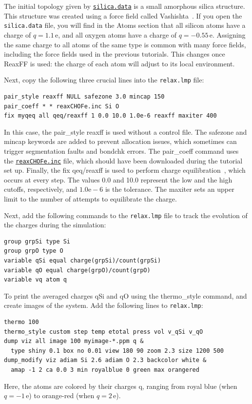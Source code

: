 \documentclass[9pt,tutorial]{livecoms}
\newcommand{\lmpcmd}[1]{\hspace{0pt}\colorbox{listing}{\textcolor{command}{\small{#1}}}\hspace{0pt}} %
\newcommand{\flecmd}[1]{\textcolor{command}{\texttt{#1}}} %
\newcommand{\dwlcmd}[1]{\textcolor{download}{\texttt{#1}}} %
\newcommand{\filepath}{https://raw.githubusercontent.com/lammpstutorials/lammpstutorials-article/main/files/}
\begin{document}
The initial topology given by \href{\filepath tutorial5/silica.data}{\dwlcmd{silica.data}}
is a small amorphous silica structure.  This structure was created using a force field called
Vashishta~\cite{vashishta1990interaction}.  If you open the \flecmd{silica.data}
file, you will find in the \lmpcmd{Atoms} section that all silicon atoms have a
charge of $q = 1.1\,\text{e}$, and all oxygen atoms have a charge of $q = -0.55\,\text{e}$.
Assigning the same charge to all atoms of the same type is common with many
force fields, including the force fields used in the previous tutorials.  This
changes once ReaxFF is used: the charge of each atom will adjust to its local
environment.

Next, copy the following three crucial lines into the \flecmd{relax.lmp} file:
\begin{lstlisting}
pair_style reaxff NULL safezone 3.0 mincap 150
pair_coeff * * reaxCHOFe.inc Si O
fix myqeq all qeq/reaxff 1 0.0 10.0 1.0e-6 reaxff maxiter 400
\end{lstlisting}
In this case, the \lmpcmd{pair\_style reaxff} is used without a control file.  The
\lmpcmd{safezone} and \lmpcmd{mincap} keywords are added to prevent
allocation issues, which sometimes can trigger segmentation faults and
\lmpcmd{bondchk} errors.  The \lmpcmd{pair\_coeff} command uses the
\href{\filepath tutorial5/reaxCHOFe.inc}{\dwlcmd{reaxCHOFe.inc}}
file, which should have been downloaded during the tutorial set up.  Finally, the
\lmpcmd{fix qeq/reaxff} is used to perform charge equilibration~\cite{rappe1991charge},
which occurs at every step.  The values 0.0 and 10.0 represent the
low and the high cutoffs, respectively, and $1.0 \text{e} -6$ is the tolerance.
The \lmpcmd{maxiter} sets an upper limit to the number of attempts to
equilibrate the charge.

Next, add the following commands to the \flecmd{relax.lmp} file to track the
evolution of the charges during the simulation:
\begin{lstlisting}
group grpSi type Si
group grpO type O
variable qSi equal charge(grpSi)/count(grpSi)
variable qO equal charge(grpO)/count(grpO)
variable vq atom q
\end{lstlisting}
To print the averaged charges \lmpcmd{qSi} and \lmpcmd{qO} using the
\lmpcmd{thermo\_style} command, and create images of the system.  Add the
following lines to \flecmd{relax.lmp}:
\begin{lstlisting}
thermo 100
thermo_style custom step temp etotal press vol v_qSi v_qO
dump viz all image 100 myimage-*.ppm q &
  type shiny 0.1 box no 0.01 view 180 90 zoom 2.3 size 1200 500
dump_modify viz adiam Si 2.6 adiam O 2.3 backcolor white &
  amap -1 2 ca 0.0 3 min royalblue 0 green max orangered
\end{lstlisting}
Here, the atoms are colored by their charges \lmpcmd{q}, ranging from royal blue
(when $q=-1\,\text{e}$) to orange-red (when $q=2\,\text{e}$).
\end{document}
